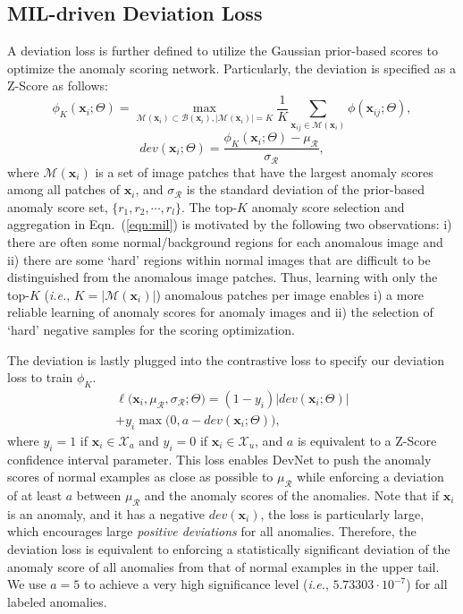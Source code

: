 \documentclass[10pt,journal,compsoc]{IEEEtran}
\newcommand{\ie}{\textit{i.e.}}
\begin{document}
\subsection{MIL-driven Deviation Loss}\label{subsec:loss}

A deviation loss is further defined to utilize the Gaussian prior-based scores to optimize the anomaly scoring network. Particularly, the deviation is specified as a Z-Score as follows:
\begin{equation}\label{eqn:mil}
    \phi_{K}(\mathbf{x}_i;\Theta) = \max_{\mathcal{M}(\mathbf{x}_i) \subset \mathcal{B}(\mathbf{x}_i), |\mathcal{M}(\mathbf{x}_i)|=K} \frac{1}{K} \sum_{\mathbf{x}_{ij} \in \mathcal{M}(\mathbf{x}_i)} \phi(\mathbf{x}_{ij};\Theta),
\end{equation}
\begin{equation}\label{eqn:deviation}
    \mathit{dev}(\mathbf{x}_{i};\Theta) = \frac{\phi_{K}(\mathbf{x}_{i};\Theta) - \mu_{\mathcal{R}}}{\sigma_{\mathcal{R}}},
\end{equation}
where $\mathcal{M}(\mathbf{x}_i)$ is a set of image patches that have the largest anomaly scores among all patches of $\mathbf{x}_i$, and $\sigma_{\mathcal{R}}$ is the standard deviation of the prior-based anomaly score set, $\{r_1, r_2, \cdots, r_l\}$. The top-$K$ anomaly score selection and aggregation in Eqn.~(\ref{eqn:mil}) is motivated by the following two observations: i) there are often some normal/background regions for each anomalous image and ii) there are some `hard' regions within normal images that are difficult to be distinguished from the anomalous image patches. Thus, learning with only the top-$K$ (\ie, $K=|\mathcal{M}(\mathbf{x}_i)|$) anomalous patches per image enables i) a more reliable learning of anomaly scores for anomaly images and ii) the selection of `hard' negative samples for the scoring optimization.

The deviation is lastly plugged into the contrastive loss \cite{hadsell2006contrastloss} to specify our deviation loss to train $\phi_K$.
\begin{multline}\label{eqn:loss}
    \ell\big(\mathbf{x}_{i}, \mu_{\mathcal{R}}, \sigma_{\mathcal{R}};\Theta \big) = (1-y_{i})|\mathit{dev}(\mathbf{x}_{i};\Theta)|\\ + y_{i} \max\big(0, a - \mathit{dev}(\mathbf{x}_{i};\Theta)\big),
\end{multline}
where $y_{i}=1$ if $\mathbf{x}_{i} \in \mathcal{X}_a$ and $y_{i}=0$ if $\mathbf{x}_{i} \in \mathcal{X}_u$, and $a$ is equivalent to a Z-Score confidence interval parameter. This loss enables DevNet to push the anomaly scores of normal examples as close as possible to $\mu_{\mathcal{R}}$ while enforcing a deviation of at least $a$ between $\mu_{\mathcal{R}}$ and the anomaly scores of the anomalies. Note that if $\mathbf{x}_{i}$ is an anomaly, and it has a negative $\mathit{dev}(\mathbf{x}_{i})$, the loss is particularly large, which encourages large \textit{positive deviations} for all anomalies. Therefore, the deviation loss is equivalent to enforcing a statistically significant deviation of the anomaly score of all anomalies from that of normal examples in the upper tail. We use $a=5$ to achieve a very high significance level (\textit{i.e.}, 
$5.73303\cdot 10^{-7}$) for all labeled anomalies. 
\end{document}
